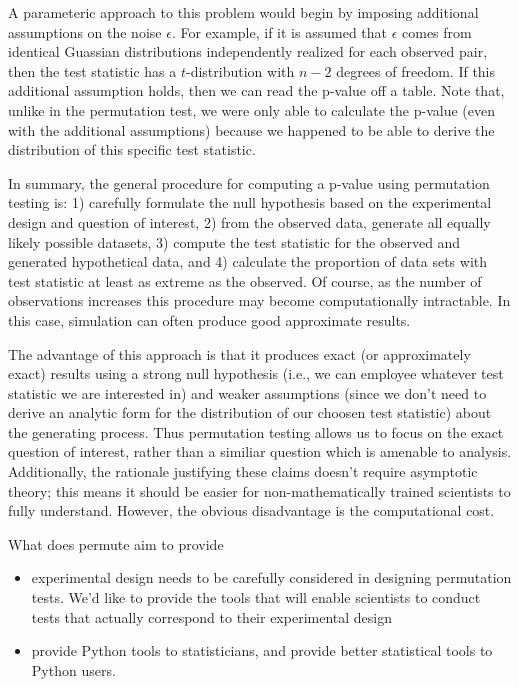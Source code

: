 A parameteric approach to this problem would begin by imposing additional
assumptions on the noise $\epsilon$.  For example, if it is assumed that
$\epsilon$ comes from identical Guassian distributions independently realized
for each observed pair, then the test statistic has a $t$-distribution with
$n-2$ degrees of freedom.  If this additional assumption holds, then we can read
the p-value off a table.  Note that, unlike in the permutation test, we were
only able to calculate the p-value (even with the additional assumptions)
because we happened to be able to derive the distribution of this specific
test statistic. 


In summary, the general procedure for computing a p-value using permutation
testing is: 1) carefully formulate the null hypothesis based on the
experimental design and question of interest, 2) from the observed data,
generate all equally likely possible datasets, 3) compute the test statistic
for the observed and generated hypothetical data, and 4) calculate the
proportion of data sets with test statistic at least as extreme as the
observed.  Of course, as the number of observations increases this procedure
may become computationally intractable.  In this case, simulation can often
produce good approximate results.

The advantage of this approach is that it produces exact (or approximately
exact) results using a strong null hypothesis (i.e., we can employee whatever
test statistic we are interested in) and weaker assumptions (since we don't
need to derive an analytic form for the distribution of our choosen test
statistic) about the generating process. Thus permutation testing allows us to
focus on the exact question of interest, rather than a similiar question which
is amenable to analysis.  Additionally, the rationale justifying these claims
doesn't require asymptotic theory; this means it should be easier for
non-mathematically trained scientists to fully understand.  However, the
obvious disadvantage is the computational cost.

What does permute aim to provide
\begin{itemize}
\item experimental design needs to be carefully considered in designing
  permutation tests. We'd like to provide the tools that will enable scientists
  to conduct tests that actually correspond to their experimental design
\item provide Python tools to statisticians, and provide better statistical
  tools to Python users.
\end{itemize}

